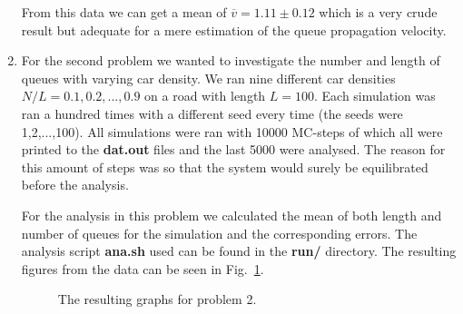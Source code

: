 \documentclass[a4paper,12pt]{article}
\begin{document}
\begin{enumerate}
From this data we can get a mean of $ \overline{v} = 1.11 \pm 0.12 $ which is a very crude result but adequate for a mere estimation of the queue propagation velocity.

\newpage
\item

For the second problem we wanted to investigate the number and length of queues with varying car density. We ran nine different car densities $N/L = 0.1,0.2,...,0.9$ on a road with length $L=100$. Each simulation was ran a hundred times with a different seed every time (the seeds were 1,2,...,100). All simulations were ran with 10000 MC-steps of which all were printed to the {\bf{dat.out}} files and the last 5000 were analysed. The reason for this amount of steps was so that the system would surely be equilibrated before the analysis.

For the analysis in this problem we calculated the mean of both length and number of queues for the simulation and the corresponding errors. The analysis script {\bf{ana.sh}} used can be found in the {\bf{run/}} directory. The resulting figures from the data can be seen in Fig.~\ref{pic:prob2}.

\begin{figure}[h]
\centering
{}
\caption{The resulting graphs for problem 2.}
\label{pic:prob2}
\end{figure}


\end{enumerate}
\end{document}
